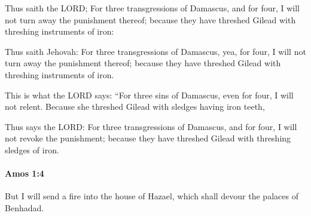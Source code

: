 			Thus saith the LORD; For three transgressions of Damascus, and for four, I will not turn away the punishment thereof; because they have threshed Gilead with threshing instruments of iron:

			\begin{versebox}
					\item[BHS] 
					\item[LXX] 
					\item[ASV] Thus saith Jehovah: For three transgressions of Damascus, yea, for four, I will not turn away the punishment thereof; because they have threshed Gilead with threshing instruments of iron.
					\item[NIV] This is what the LORD says: “For three sins of Damascus, even for four, I will not relent. Because she threshed Gilead with sledges having iron teeth,
					\item[NRSV] Thus says the LORD: For three transgressions of Damascus, and for four, I will not revoke the punishment; because they have threshed Gilead with threshing sledges of iron.
			\end{versebox}

		\paragraph{Amos 1:4} %
			\label{AMOS-1-4}

			But I will send a fire into the house of Hazael, which shall devour the palaces of Benhadad.

